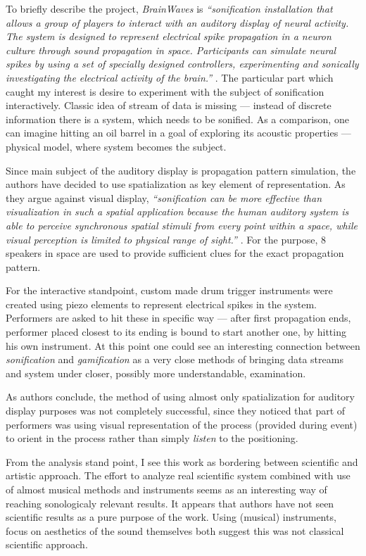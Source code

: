 \documentclass[12pt,a4paper,oneside]{report}
\begin{document}
To briefly describe the project, \emph{BrainWaves} is \emph{``sonification installation that allows a group of players to interact with an auditory display of neural activity. The system is designed to represent electrical spike propagation in a neuron culture through sound propagation in space. Participants can simulate neural spikes by using a set of specially designed controllers, experimenting and sonically investigating the electrical activity of the brain.''} \cite[p.~9]{Weinberg2006}. The particular part which caught my interest is desire to experiment with the subject of sonification interactively. Classic idea of stream of data is missing --- instead of discrete information there is a system, which needs to be sonified. As a comparison, one can imagine hitting an oil barrel in a goal of exploring its acoustic properties --- physical model, where system becomes the subject.

Since main subject of the auditory display is propagation pattern simulation, the authors have decided to use spatialization as key element of representation. As they argue against visual display, \emph{``sonification can be more effective than visualization in such a spatial application because the human auditory system is able to perceive synchronous spatial stimuli from every point within a space, while visual perception is limited to physical range of sight.''} \cite[p.~9]{Weinberg2006}. For the purpose, 8 speakers in space are used to provide sufficient clues for the exact propagation pattern.

For the interactive standpoint, custom made drum trigger instruments were created using piezo elements to represent electrical spikes in the system. Performers are asked to hit these in specific way --- after first propagation ends, performer placed closest to its ending is bound to start another one, by hitting his own instrument. At this point one could see an interesting connection between \emph{sonification} and \emph{gamification} as a very close methods of bringing data streams and system under closer, possibly more understandable, examination.

As authors conclude, the method of using almost only spatialization for auditory display purposes was not completely successful, since they noticed that part of performers was using visual representation of the process (provided during event) to orient in the process rather than simply \emph{listen} to the positioning. 

From the analysis stand point, I see this work as bordering between scientific and artistic approach. The effort to analyze real scientific system combined with use of almost musical methods and instruments seems as an interesting way of reaching sonologicaly relevant results. It appears that authors have not seen scientific results as a pure purpose of the work. Using (musical) instruments, focus on aesthetics of the sound themselves both suggest this was not classical scientific approach.
\end{document}
